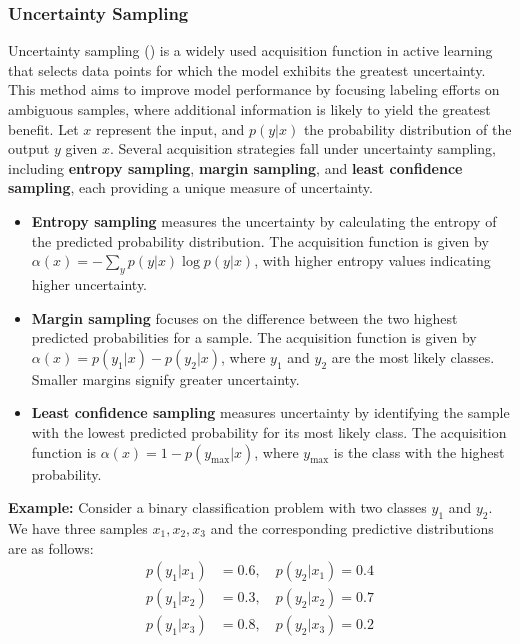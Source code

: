 \documentclass[
  letterpaper,
  numbers=noenddot,
  DIV=11,
  oneside]{scrreprt}
\theoremstyle{remark}
\begin{document}
\subsubsection{Uncertainty Sampling}\label{uncertainty-sampling}

Uncertainty sampling () is
a widely used acquisition function in active learning that selects data
points for which the model exhibits the greatest uncertainty. This
method aims to improve model performance by focusing labeling efforts on
ambiguous samples, where additional information is likely to yield the
greatest benefit. Let \(x\) represent the input, and \(p(y|x)\) the
probability distribution of the output \(y\) given \(x\). Several
acquisition strategies fall under uncertainty sampling, including
\textbf{entropy sampling}, \textbf{margin sampling}, and \textbf{least
confidence sampling}, each providing a unique measure of uncertainty.

\begin{itemize}
\item
  \textbf{Entropy sampling} measures the uncertainty by calculating the
  entropy of the predicted probability distribution. The acquisition
  function is given by \(\alpha(x) = - \sum_{y} p(y|x) \log p(y|x)\),
  with higher entropy values indicating higher uncertainty.
\item
  \textbf{Margin sampling} focuses on the difference between the two
  highest predicted probabilities for a sample. The acquisition function
  is given by \(\alpha(x) = p(y_1|x) - p(y_2|x)\), where \(y_1\) and
  \(y_2\) are the most likely classes. Smaller margins signify greater
  uncertainty.
\item
  \textbf{Least confidence sampling} measures uncertainty by identifying
  the sample with the lowest predicted probability for its most likely
  class. The acquisition function is
  \(\alpha(x) = 1 - p(y_{\text{max}}|x)\), where \(y_{\text{max}}\) is
  the class with the highest probability.
\end{itemize}

\textbf{Example:} Consider a binary classification problem with two
classes \(y_1\) and \(y_2\). We have three samples \(x_1, x_2, x_3\) and
the corresponding predictive distributions are as follows:
\[\begin{aligned}
p(y_1|x_1) &= 0.6, \quad p(y_2|x_1) = 0.4\\
p(y_1|x_2) &= 0.3, \quad p(y_2|x_2) = 0.7\\
p(y_1|x_3) &= 0.8, \quad p(y_2|x_3) = 0.2
\end{aligned}\]
\end{document}

